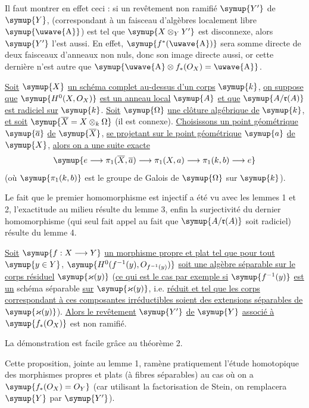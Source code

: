 Il faut montrer en effet ceci : si un revêtement non ramifié $\symup{Y'}$ de $\symup{Y}$,
(correspondant à un faisceau d'algèbres localement libre $\symup{\text{\uwave{A}}}$) est tel
que $\symup{X\otimes_Y Y'}$ est disconnexe, alors $\symup{Y'}$ l'est aussi. En effet,
$\symup{f^*(\text{\uwave{A}})}$ sera somme directe de deux faisceaux d'anneaux non nuls, donc
son image directe aussi, or cette dernière n'est autre que
$\symup{\text{\uwave{A}}\otimes f_*(O_X)=\text{\uwave{A}}}$.

 \uline{Soit} $\symup{X}$ \uline{un schéma complet au-dessus d'un corps} $\symup{k}$, \uline{on
suppose que} $\symup{H^0(X,O_X)}$ \uline{est un anneau local} $\symup{A}$ \uline{et que}
$\symup{A/\mathfrak r(A)}$ \uline{est radiciel sur} $\symup{k}$. \uline{Soit} $\symup{\Omega}$ \uline{une clôture algébrique
de} $\symup{k}$, \uline{et soit} $\symup{\overline X=X\otimes_k\Omega}$ (il est connexe). \uline{Choisissons un
point géométrique} $\symup{\overline a}$ \uline{de} $\symup{\overline X}$, \uline{se projetant sur le point
géométrique} $\symup{a}$ \uline{de} $\symup{X}$, \uline{alors on a une suite exacte}
\[
  \symup{e\longrightarrow\pi_1(\overline X,\overline a)
  \longrightarrow\pi_1(X,a)
  \longrightarrow\pi_1(k,b)\longrightarrow e}
\]
(où $\symup{\pi_1(k,b)}$ est le groupe de Galois de $\symup{\Omega}$ sur $\symup{k}$).

Le fait que le premier homomorphisme est injectif a été vu avec les lemmes 1 et
2, l'exactitude au milieu résulte du lemme 3, enfin la surjectivité du dernier
homomorphisme (qui seul fait appel au fait que $\symup{A/\mathfrak r(A)}$ soit
radiciel) résulte du lemme 4.

 \uline{Soit} $\symup{f:X\longrightarrow Y}$ \uline{un morphisme propre et
plat tel que pour tout} $\symup{y\in Y}$,
$\symup{H^0(f^{-1}(y),O_{f^{-1}(y)})}$ \uline{soit une algèbre séparable sur le corps
résiduel} $\symup{\varkappa(y)}$ (\uline{ce qui est le cas par exemple si} $\symup{f^{-1}(y)}$ \uline{est un}
schéma séparable \uline{sur} $\symup{\varkappa(y)}$, i.e. \uline{réduit et tel que les corps correspondant
à ces composantes irréductibles soient des extensions séparables de}
$\symup{\varkappa(y)}$). \uline{Alors le revêtement}
$\symup{Y'}$ \uline{de} $\symup{Y}$ \uline{associé à} $\symup{f_*(O_X)}$ est non ramifié.

La démonstration est facile grâce au théorème 2.

Cette proposition, jointe au lemme 1, ramène pratiquement l'étude homotopique
des morphismes propres et plats (à fibres séparables) au cas où on a
$\symup{f_*(O_X)=O_Y}$ (car utilisant la factorisation de Stein, on remplacera
$\symup{Y}$ par $\symup{Y'}$).

